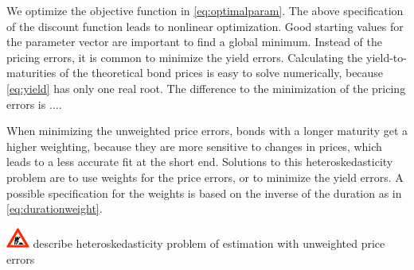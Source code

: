We optimize the objective function in \eqref{eq:optimalparam}. The above specification of the discount function leads to nonlinear optimization. Good starting values for the parameter vector are important to find a global minimum. Instead of the pricing errors, it is common to minimize the yield errors. Calculating the yield-to-maturities of the theoretical bond prices is easy to solve numerically, because \eqref{eq:yield} has only one real root. The difference to the minimization of the pricing errors is $\dots$.

When minimizing the unweighted price errors, bonds with a longer maturity get a higher weighting, because they are more sensitive to changes in prices, which leads to a less accurate fit at the short end. Solutions to this heteroskedasticity problem are to use weights for the price errors, or to minimize the yield errors. A possible specification for the weights is based on the inverse of the duration as in \eqref{eq:durationweight}.

\includegraphics[width=0.3in]{baustelle} describe heteroskedasticity problem of estimation with unweighted price errors

